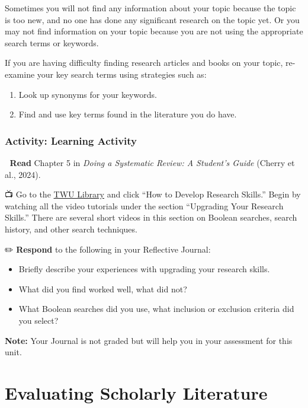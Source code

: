 \documentclass[
  letterpaper,
  DIV=11,
  numbers=noendperiod]{scrreprt}
\providecommand{\tightlist}{%
  \setlength{\itemsep}{0pt}\setlength{\parskip}{0pt}}\usepackage{longtable,booktabs,array}
\begin{document}
Sometimes you will not find any information about your topic because the
topic is too new, and no one has done any significant research on the
topic yet. Or you may not find information on your topic because you are
not using the appropriate search terms or keywords.

If you are having difficulty finding research articles and books on your
topic, re-examine your key search terms using strategies such as:

\begin{enumerate}
\def\labelenumi{\arabic{enumi}.}
\tightlist
\item
  Look up synonyms for your keywords.
\item
  Find and use key terms found in the literature you do have.
\end{enumerate}

\subsection*{Activity: Learning
Activity}\label{activity-learning-activity-6}

📖 \textbf{Read} Chapter 5 in \emph{Doing a Systematic Review: A
Student's Guide} (Cherry et al., 2024).

📺 Go to the \href{https://libguides.twu.ca/library_research/home}{TWU
Library} and click ``How to Develop Research Skills.'' Begin by watching
all the video tutorials under the section ``Upgrading Your Research
Skills.'' There are several short videos in this section on Boolean
searches, search history, and other search techniques.

✏️ \textbf{Respond} to the following in your Reflective Journal:

\begin{itemize}
\tightlist
\item
  Briefly describe your experiences with upgrading your research skills.
\item
  What did you find worked well, what did not?
\item
  What Boolean searches did you use, what inclusion or exclusion
  criteria did you select?
\end{itemize}

\textbf{Note:} Your Journal is not graded but will help you in your
assessment for this unit.


\chapter*{Evaluating Scholarly
Literature}\label{evaluating-scholarly-literature}
\end{document}

